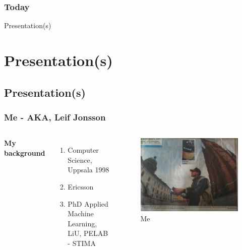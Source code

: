 \documentclass{beamer}
\begin{document}
\begin{frame}
	\frametitle{Today} 
	\Huge{\centerline{Presentation(s)}}
\end{frame}

\section{Presentation(s)}

\subsection{Presentation(s)} %

\begin{frame}
\frametitle{Me - AKA, Leif Jonsson}
\begin{columns}[c] %

\textbf{My background}
\begin{enumerate}
\item Computer Science, Uppsala 1998
\item Ericsson
\item PhD Applied Machine Learning, LiU, PELAB - STIMA
\end{enumerate}

\begin{figure}[!ht]
	\includegraphics[scale=0.20]{figures/Leif}
	\caption{Me}
	\label{fig:leif}
\end{figure}

\end{columns}
\end{frame}
\end{document}
